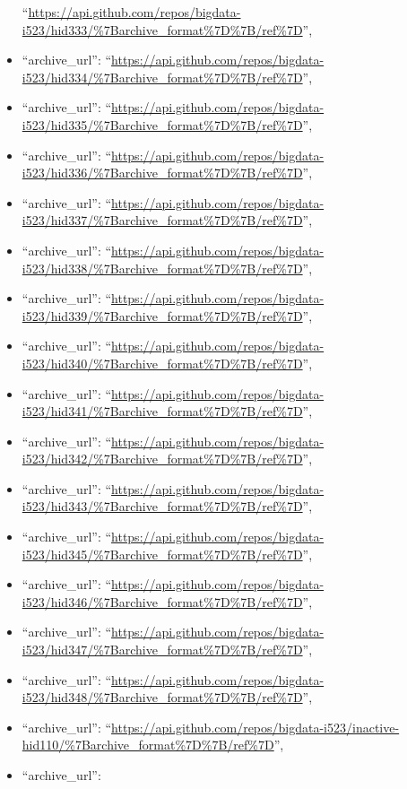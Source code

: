 \begin{itemize}
  ``\url{https://api.github.com/repos/bigdata-i523/hid333/\%7Barchive_format\%7D\%7B/ref\%7D}'',
\item
  ``archive\_url'':
  ``\url{https://api.github.com/repos/bigdata-i523/hid334/\%7Barchive_format\%7D\%7B/ref\%7D}'',
\item
  ``archive\_url'':
  ``\url{https://api.github.com/repos/bigdata-i523/hid335/\%7Barchive_format\%7D\%7B/ref\%7D}'',
\item
  ``archive\_url'':
  ``\url{https://api.github.com/repos/bigdata-i523/hid336/\%7Barchive_format\%7D\%7B/ref\%7D}'',
\item
  ``archive\_url'':
  ``\url{https://api.github.com/repos/bigdata-i523/hid337/\%7Barchive_format\%7D\%7B/ref\%7D}'',
\item
  ``archive\_url'':
  ``\url{https://api.github.com/repos/bigdata-i523/hid338/\%7Barchive_format\%7D\%7B/ref\%7D}'',
\item
  ``archive\_url'':
  ``\url{https://api.github.com/repos/bigdata-i523/hid339/\%7Barchive_format\%7D\%7B/ref\%7D}'',
\item
  ``archive\_url'':
  ``\url{https://api.github.com/repos/bigdata-i523/hid340/\%7Barchive_format\%7D\%7B/ref\%7D}'',
\item
  ``archive\_url'':
  ``\url{https://api.github.com/repos/bigdata-i523/hid341/\%7Barchive_format\%7D\%7B/ref\%7D}'',
\item
  ``archive\_url'':
  ``\url{https://api.github.com/repos/bigdata-i523/hid342/\%7Barchive_format\%7D\%7B/ref\%7D}'',
\item
  ``archive\_url'':
  ``\url{https://api.github.com/repos/bigdata-i523/hid343/\%7Barchive_format\%7D\%7B/ref\%7D}'',
\item
  ``archive\_url'':
  ``\url{https://api.github.com/repos/bigdata-i523/hid345/\%7Barchive_format\%7D\%7B/ref\%7D}'',
\item
  ``archive\_url'':
  ``\url{https://api.github.com/repos/bigdata-i523/hid346/\%7Barchive_format\%7D\%7B/ref\%7D}'',
\item
  ``archive\_url'':
  ``\url{https://api.github.com/repos/bigdata-i523/hid347/\%7Barchive_format\%7D\%7B/ref\%7D}'',
\item
  ``archive\_url'':
  ``\url{https://api.github.com/repos/bigdata-i523/hid348/\%7Barchive_format\%7D\%7B/ref\%7D}'',
\item
  ``archive\_url'':
  ``\url{https://api.github.com/repos/bigdata-i523/inactive-hid110/\%7Barchive_format\%7D\%7B/ref\%7D}'',
\item
  ``archive\_url'':

\end{itemize}
